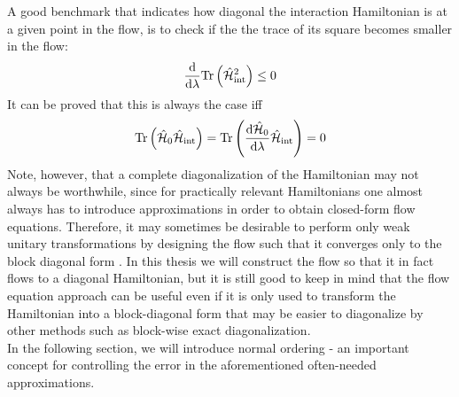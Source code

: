 A good benchmark that indicates how diagonal the interaction Hamiltonian is at a given point in the flow, is to check if the the trace of its square becomes smaller in the flow:
\begin{equation}\label{check_trace}
\frac{\mathrm d}{\mathrm d \lambda}\mathrm{Tr}\left(\hat{\mathcal{H}}^2_{\mathrm{int}}\right)\leq 0
\end{equation}
It can be proved \cite[pp. 27-28]{kehrein2006flow} that this is always the case iff 
\begin{align}\label{useless_check}
\mathrm{Tr}\left(\hat{\mathcal{H}}_0\hat{\mathcal{H}}_{\mathrm{int}}\right)=\mathrm{Tr}\left(\frac{\mathrm d\hat{\mathcal{H}}_0}{\mathrm d\lambda} \hat{\mathcal{H}}_{\mathrm{int}}\right)=0
\end{align}
Note, however, that a complete diagonalization of the Hamiltonian may not always be worthwhile, since for practically relevant Hamiltonians one almost always has to introduce approximations in order to obtain closed-form flow equations. Therefore, it may sometimes be desirable to perform only weak unitary transformations by designing the flow such that it converges only to the block diagonal form \cite{Wegner_2006}. In this thesis we will construct the flow so that it in fact flows to a diagonal Hamiltonian, but it is still good to keep in mind that the flow equation approach can be useful even if it is only used to transform the Hamiltonian into a block-diagonal form that may be easier to diagonalize by other methods such as block-wise exact diagonalization.\\ 
In the following section, we will introduce normal ordering - an important concept for controlling the error in the aforementioned often-needed approximations.
